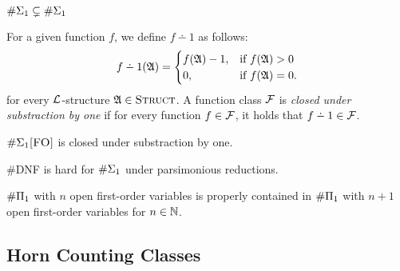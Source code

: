 \begin{theorem}
	$\#\Sigma_1 \subsetneq \#\Sigma_{1}$
\end{theorem}

For a given function $f$, we define $f \dotminus 1$ as follows:
\begin{eqnarray*}
	f \dotminus 1(\A) =
	\begin{cases}
		f(\A)-1, & \text{if }f(\A) > 0 \\
		0, & \text{if }f(\A) = 0.
	\end{cases}
\end{eqnarray*}
for every $\L$-structure $\mathfrak{A} \in \text{\sc Struct}$. A function class $\F$ is {\em closed under substraction by one} if for every function $f \in \F$, it holds that $f \dotminus 1 \in \F$.

\begin{theorem}
	$\#\Sigma_{1}\textsc{[FO]}$ is closed under substraction by one.
\end{theorem}

\begin{theorem}
	{\sc \#DNF} is hard for $\#\Sigma_{1}$ under parsimonious reductions. 
\end{theorem}

\begin{theorem}
	$\#\Pi_{1}$ with $n$ open first-order variables is properly contained in $\#\Pi_{1}$ with $n+1$ open first-order variables for $n\in\mathbb{N}$.  
\end{theorem}

\subsection{Horn Counting Classes}

